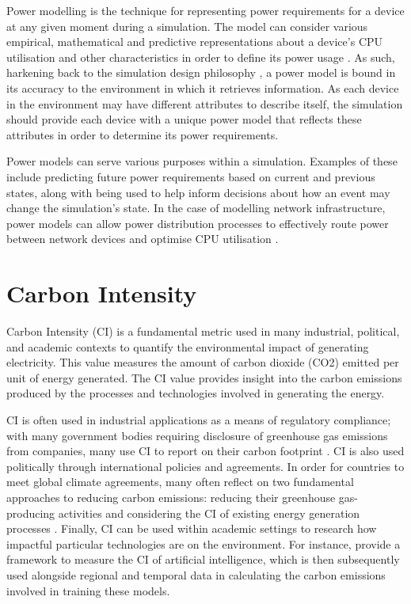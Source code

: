 \documentclass{l4proj}
\begin{document}
Power modelling is the technique for representing power requirements for a device at any given moment during a simulation.
The model can consider various empirical, mathematical and predictive representations about a device's CPU utilisation and other characteristics in order to define its power usage \citep{IET_Power_System_Modeling}.
As such, harkening back to the simulation design philosophy \citep{simulations}, a power model is bound in its accuracy to the environment in which it retrieves information.
As each device in the environment may have different attributes to describe itself, the simulation should provide each device with a unique power model that reflects these attributes in order to determine its power requirements.

Power models can serve various purposes within a simulation.
Examples of these include predicting future power requirements based on current and previous states, along with being used to help inform decisions about how an event may change the simulation's state.
In the case of modelling network infrastructure, power models can allow power distribution processes to effectively route power between network devices and optimise CPU utilisation \citep{etap}.

\section{Carbon Intensity}

Carbon Intensity (CI) is a fundamental metric used in many industrial, political, and academic contexts to quantify the environmental impact of generating electricity.
This value measures the amount of carbon dioxide (CO2) emitted per unit of energy generated.
The CI value provides insight into the carbon emissions produced by the processes and technologies involved in generating the energy.

CI is often used in industrial applications as a means of regulatory compliance; with many government bodies requiring disclosure of greenhouse gas emissions from companies, many use CI to report on their carbon footprint \citep{industry_ci}.
CI is also used politically through international policies and agreements.
In order for countries to meet global climate agreements, many often reflect on two fundamental approaches to reducing carbon emissions: reducing their greenhouse gas-producing activities and considering the CI of existing energy generation processes \cite{political_ci}.
Finally, CI can be used within academic settings to research how impactful particular technologies are on the environment.
For instance, \cite{academic_ci} provide a framework to measure the CI of artificial intelligence, which is then subsequently used alongside regional and temporal data in calculating the carbon emissions involved in training these models.
\end{document}
